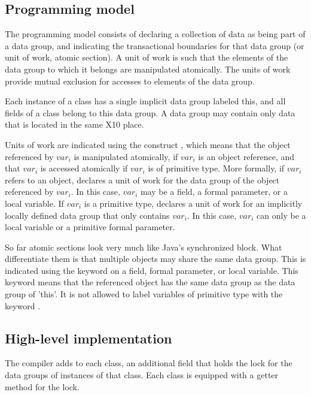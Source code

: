 \documentclass{article}
\begin{document}
\subsection{Programming model}

The programming model consists of declaring a collection of data as being part of a data group, and indicating the transactional boundaries for that data group (or unit of work, atomic section). A unit of work is such that the elements of the data group to which it belongs are manipulated atomically. The units of work provide mutual exclusion for accesses to elements of the data group.

Each instance of a class has a single implicit data group labeled this, and all fields of a class belong to this data group. A data group may contain only data that is located in the same X10 place.

Units of work are indicated using the construct , which means that the object referenced by $var_i$ is manipulated atomically, if $var_i$ is an object reference, and that  $var_i$ is accessed atomically if  $var_i$ is of primitive type. More formally, if  $var_i$ refers to an object,  declares a unit of work for the data group of the object referenced by  $var_i$. In this case,  $var_i$ may be a field, a formal parameter, or a local variable.
If  $var_i$ is a primitive type,   declares a unit of work for an implicitly locally defined data group that only contains $var_i$. In this case, $var_i$ can only be a local variable or a primitive formal parameter.

So far atomic sections look very much like Java's synchronized block. What differentiate them is that multiple objects may share the same data group. This is indicated using the  keyword on a field, formal parameter, or local variable. This keyword means that the referenced object has the same data group as the data group of 'this'. It is not allowed to label variables of primitive type with the keyword .

\subsection{High-level implementation}


The compiler adds to each class, an additional field that holds the lock for the data groups of instances of that class.
 Each class is equipped with a getter method for the lock.
\end{document}
